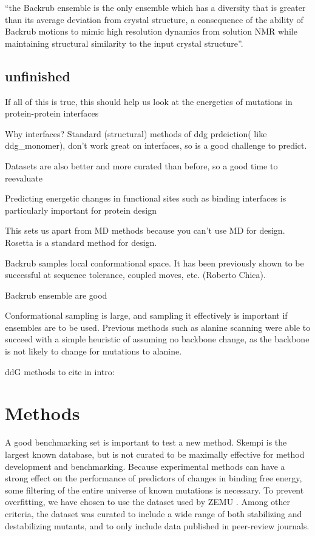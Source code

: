 ``the Backrub ensemble is the only ensemble which has a diversity that is greater than its average deviation from crystal structure, a consequence of the ability of Backrub motions to mimic high resolution dynamics from solution NMR while maintaining structural similarity to the input crystal structure''.\cite{davey_improving_2014}

\subsection{unfinished}
If all of this is true, this should help us look at the energetics of mutations in protein-protein interfaces

Why interfaces? Standard (structural) methods of ddg prdeiction( like ddg\_monomer), don't work great on interfaces, so is a good challenge to predict.

Datasets are also better and more curated than before, so a good time to reevaluate

Predicting energetic changes in functional sites such as binding interfaces is particularly important for protein design

This sets us apart from MD methods because you can’t use MD for design. Rosetta is a standard method for design.

Backrub samples local conformational space.
It has been previously shown to be successful at sequence tolerance, coupled moves, etc. (Roberto Chica).

Backrub ensemble are good \cite{schenkelberg_protein_2016}

Conformational sampling is large, and sampling it effectively is important if ensembles are to be used. Previous methods such as alanine scanning were able to succeed with a simple heuristic of assuming no backbone change, as the backbone is not likely to change for mutations to alanine.

ddG methods to cite in intro:\cite{vangone_contacts-based_2015}

\section{Methods}

A good benchmarking set is important to test a new method. Skempi \cite{moal_skempi:_2012} is the largest known database, but is not curated to be maximally effective for method development and benchmarking. Because experimental methods can have a strong effect on the performance of predictors of changes in binding free energy\cite{geng_exploring_2016}, some filtering of the entire universe of known mutations is necessary. To prevent overfitting, we have chosen to use the dataset used by ZEMU \cite{dourado_multiscale_2014}. Among other criteria, the dataset was curated to include a wide range of both stabilizing and destabilizing mutants, and to only include data published in peer-review journals.

